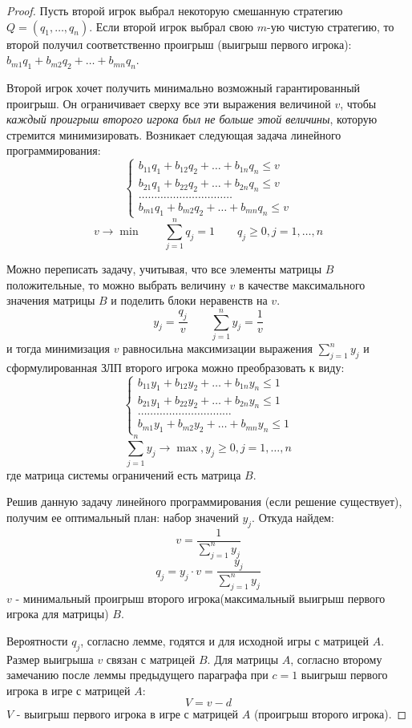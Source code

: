\documentclass[aps,%
12pt,%
final,%
oneside,
onecolumn,%
musixtex, %
superscriptaddress,%
centertags]{article} %
\theoremstyle{plain}
\theoremstyle{definition}
\theoremstyle{remark}
\begin{document}
\begin{proof}
Пусть второй игрок выбрал некоторую смешанную стратегию $Q = (q_1,\ldots,q_n)$. Если второй игрок выбрал свою $m$-ую чистую стратегию, то второй получил соответственно проигрыш (выигрыш первого игрока): $b_{m1}q_1+b_{m2}q_2 + \ldots + b_{mn}q_n$.

Второй игрок хочет получить минимально возможный гарантированный проигрыш. Он ограничивает сверху все эти выражения величиной $v$, чтобы \textit{каждый проигрыш второго игрока был не больше этой величины}, которую стремится минимизировать. Возникает следующая задача линейного программирования:
$$\begin{cases}
  b_{11}q_1+b_{12}q_2 + \ldots + b_{1n}q_n \leq v \\
  b_{21}q_1+b_{22}q_2 + \ldots + b_{2n}q_n \leq v \\
  \ldots \ldots \ldots \ldots \ldots\ldots \ldots \ldots \ldots \ldots  \\
  b_{m1}q_1+b_{m2}q_2 + \ldots + b_{mn}q_n \leq v
\end{cases}$$
$$v \to \min \qquad \sum\limits_{j=1}^n q_j = 1 \qquad q_j  \geq 0, j = 1,\ldots,n$$

Можно переписать задачу, учитывая, что все элементы матрицы $B$ положительные, то можно выбрать величину $v$ в качестве максимального значения матрицы $B$ и поделить блоки неравенств на $v$.
$$y_j = \frac{q_j}{v} \qquad \sum\limits_{j=1}^n y_j = \frac{1}{v}$$
и тогда минимизация $v$ равносильна максимизации выражения $\sum\limits_{j=1}^n y_j$ и сформулированная ЗЛП второго игрока можно преобразовать к виду:
$$\begin{cases}
  b_{11}y_1+b_{12}y_2 + \ldots + b_{1n}y_n \leq 1 \\
  b_{21}y_1+b_{22}y_2 + \ldots + b_{2n}y_n \leq 1 \\
  \ldots \ldots \ldots \ldots \ldots\ldots \ldots \ldots \ldots \ldots  \\
  b_{m1}y_1+b_{m2}y_2 + \ldots + b_{mn}y_n \leq 1
\end{cases}$$
$$\sum\limits_{j=1}^n y_j \to \max, y_j \geq 0, j = 1,\ldots,n$$
где матрица системы ограничений есть матрица $B$.

Решив данную задачу линейного программирования (если решение существует), получим ее оптимальный план: набор значений $y_j$. Откуда найдем:
$$v = \frac{1}{\sum\limits_{j=1}^n y_j}$$
$$q_j = y_j \cdot v = \frac{y_j}{\sum\limits_{j=1}^n y_j}$$
$v$ - минимальный проигрыш второго игрока(максимальный выигрыш первого игрока для матрицы) $B$.

Вероятности $q_j$, согласно лемме, годятся и для исходной игры с матрицей $A$. Размер выигрыша $v$ связан с матрицей $B$. Для матрицы $A$, согласно второму замечанию после леммы предыдущего параграфа при $c=1$ выигрыш первого игрока в игре с матрицей $A$:
$$V = v - d$$
$V$ - выигрыш первого игрока в игре с матрицей $A$ (проигрыш второго игрока).


\end{proof}
\end{document}
